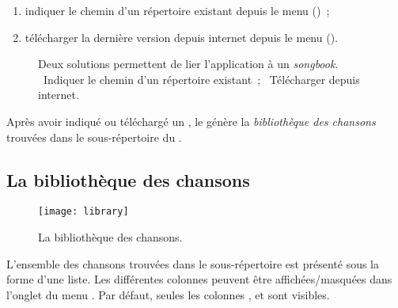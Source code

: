 \begin{enumerate}
\item indiquer le chemin d'un répertoire  existant
  depuis le menu 
  ()~;
\item télécharger la dernière version depuis internet depuis le menu
   ().
\end{enumerate}

\begin{figure}
  \centering
  \hspace{0.1cm}%
  \caption[Lier]{%
    Deux solutions permettent de lier l'application à un \emph{songbook}.
    ~Indiquer le chemin d'un répertoire existant~;%
    ~Télécharger depuis internet.%
  }%
  \label{fig:solutions}
\end{figure}

Après avoir indiqué ou téléchargé un \recueil, le \client génère la
\emph{bibliothèque des chansons} trouvées dans le sous-répertoire
 du \recueil.

\subsection{La bibliothèque des chansons}

\begin{figure}
  \centering
  \texttt{[image: library]}
  \caption{La bibliothèque des chansons.}
  \label{fig:library}
\end{figure}

L'ensemble des chansons  trouvées dans le sous-répertoire
 est présenté sous la forme d'une liste. Les
différentes colonnes peuvent être affichées/masquées dans l'onglet
 du menu . Par défaut,
seules les colonnes ,  et
 sont visibles.

